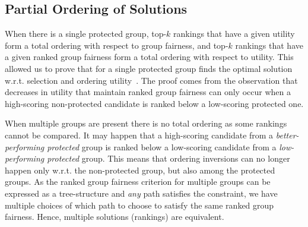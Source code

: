 \subsection{Partial Ordering of Solutions}
\label{sec:algo:partialOrdering}
When there is a single protected group,
top-$k$ rankings that have a given utility form a total ordering with respect to group fairness, and
top-$k$ rankings that have a given ranked group fairness form a total ordering with respect to utility.
%
This allowed us to prove that \algoFAIR for a single protected group finds the optimal solution w.r.t. selection and ordering utility~\cite{zehlike2017fair}.
%
The proof comes from the observation that decreases in utility that maintain ranked group fairness can only occur when a high-scoring non-protected candidate is ranked below a low-scoring protected one. %
%

When multiple groups are present there is no total ordering as some rankings cannot be compared.
%
It may happen that a high-scoring candidate from a \emph{better-performing protected} group is ranked below a low-scoring candidate from a \emph{low-performing protected} group.
%
This means that ordering inversions can no longer happen only w.r.t. the non-protected group, but also among the protected groups.
%
As the ranked group fairness criterion for multiple groups can be expressed as a tree-structure and \emph{any} path satisfies the constraint, we have multiple choices of which path to choose to satisfy the same ranked group fairness.
%
Hence, multiple solutions (rankings) are equivalent.
%


